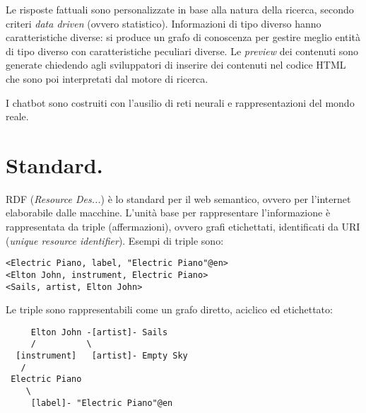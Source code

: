 \documentclass[11pt]{article}
\begin{document}
\begin{multicols}{2}
Le risposte fattuali sono personalizzate in base alla natura della ricerca, secondo criteri \textit{data driven} (ovvero statistico).
Informazioni di tipo diverso hanno caratteristiche diverse: si produce un grafo di conoscenza per gestire meglio entità di tipo diverso con caratteristiche peculiari diverse.
Le \textit{preview} dei contenuti sono generate chiedendo agli sviluppatori di inserire dei contenuti nel codice HTML che sono poi interpretati dal motore di ricerca.

I chatbot sono costruiti con l'ausilio di reti neurali e rappresentazioni del mondo reale.


\section{Standard.}
RDF (\textit{Resource Des...}) è lo standard per il web semantico, ovvero per l'internet elaborabile dalle macchine.
L'unità base per rappresentare l'informazione è rappresentata da triple (affermazioni), ovvero grafi etichettati, identificati da URI (\textit{unique resource identifier}).
Esempi di triple sono:
\end{multicols}
\begin{verbatim}
<Electric Piano, label, "Electric Piano"@en>
<Elton John, instrument, Electric Piano>
<Sails, artist, Elton John>
\end{verbatim}
Le triple sono rappresentabili come un grafo diretto, aciclico ed etichettato:
\begin{verbatim}
     Elton John -[artist]- Sails
     /          \
  [instrument]   [artist]- Empty Sky
   /
 Electric Piano 
    \
     [label]- "Electric Piano"@en
\end{verbatim}
\end{document}
